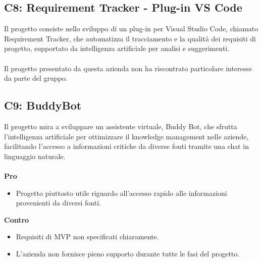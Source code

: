 \subsection{C8: Requirement Tracker - Plug-in VS Code}
Il progetto consiste nello sviluppo di un plug-in per Visual Studio Code, chiamato Requirement Tracker, che automatizza il tracciamento e la qualità dei requisiti di progetto, supportato da intelligenza artificiale per analisi e suggerimenti.\\\\
Il progetto presentato da questa azienda non ha riscontrato particolare interesse da parte del gruppo.


\subsection{C9: BuddyBot}
Il progetto mira a sviluppare un assistente virtuale, Buddy Bot, che sfrutta l'intelligenza artificiale per ottimizzare il knowledge management nelle aziende, facilitando l'accesso a informazioni critiche da diverse fonti tramite una chat in linguaggio naturale.\\\\
\textbf{Pro}
\begin{itemize}
    \item Progetto piuttosto utile riguardo all'accesso rapido alle informazioni provenienti da diversi fonti.
\end{itemize}
\textbf{Contro}
\begin{itemize}
    \item Requisiti di MVP non specificati chiaramente.
    \item L'azienda non fornisce pieno supporto durante tutte le fasi del progetto.
\end{itemize}
